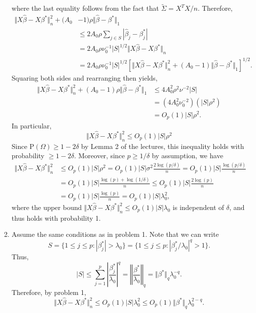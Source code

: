 \documentclass[12pt]{article}
\newcommand{\Prob}{\mathrm{P}}
\begin{document}
\begin{enumerate}
where the last equality follows from the fact that $\widetilde{\Sigma} = X^T X / n$. Therefore,
\begin{align*}
\Vert X\hat{\beta} - X\beta^* \Vert_n^2 + (A_0& - 1)\rho \Vert \hat{\beta} - \beta^* \Vert_1 \\
&\leq 2A_0 \rho \sum_{j \in S} |\hat{\beta}_j - \beta^*_j| \\
&= 2A_0 \rho \nu_0^{-1} |S|^{1/2} \Vert X\hat{\beta} - X\beta^* \Vert_n \\
&= 2A_0 \rho \nu_0^{-1} |S|^{1/2} [\Vert X\hat{\beta} - X\beta^* \Vert_n^2 + (A_0 - 1) \Vert \hat{\beta} - \beta^* \Vert_1]^{1/2}.
\end{align*}
Squaring both sides and rearranging then yields,
\begin{align*}
\Vert X\hat{\beta} - X\beta^* \Vert_n^2 + (A_0 - 1)\rho \Vert \hat{\beta} - \beta^* \Vert_1 &\leq 4A_0^2\rho^2 \nu^{-2} |S| \\
&= (4A_0^2\nu_0^{-2})(|S|\rho^2) \\
&= O_p(1)|S|\rho^2.
\end{align*}
In particular,
\begin{equation*}
\Vert X\hat{\beta} - X\beta^* \Vert_n^2 \leq O_p(1)|S|\rho^2
\end{equation*}
Since $\Prob(\Omega) \geq 1 - 2\delta$ by Lemma 2 of the lectures, this inequality holds with probability $\geq 1 - 2\delta$. Moreover, since $p \geq 1 / \delta$ by assumption, we have
\begin{align*}
\Vert X\hat{\beta} - X\beta^* \Vert_n^2 &\leq O_p(1)|S|\rho^2 = O_p(1) |S| \sigma^2 \frac{2\log(p / \delta)}{n} = O_p(1) |S| \frac{\log(p / \delta)}{n} \\
&= O_p(1) |S| \frac{\log(p) + \log(1 / \delta)}{n} \leq O_p(1) |S| \frac{2\log(p)}{n} \\
&= O_p(1) |S| \frac{\log(p)}{n} = O_p(1) |S| \lambda_0^2,
\end{align*}
where the upper bound $\Vert X\hat{\beta} - X\beta^* \Vert_n^2 \leq O_p(1) |S| \lambda_0$ is independent of $\delta$, and thus holds with probability 1.

\item
Assume the same conditions as in problem 1. Note that we can write
\begin{equation*}
S = \{1 \leq j \leq p : |\beta^*_j| > \lambda_0\} = \{1 \leq j \leq p : |\beta^*_j / \lambda_0|^q > 1\}.
\end{equation*}
Thus,
\begin{equation*}
|S| \leq \sum_{j=1}^p \left|\frac{\beta^*_j}{\lambda_0}\right|^q = \left\Vert\frac{\beta^*}{\lambda_0}\right\Vert_q = \Vert \beta^* \Vert_q \lambda_0^{-q}.
\end{equation*}
Therefore, by problem 1,
\begin{equation*}
\Vert X\hat{\beta} - X\beta^* \Vert_n^2 \leq O_p(1)|S|\lambda_0^2 \leq O_p(1)\Vert \beta^* \Vert_q \lambda_0^{2-q}.
\end{equation*}


\end{enumerate}
\end{document}
